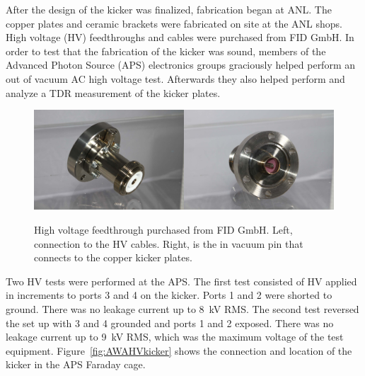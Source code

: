 

After the design of the kicker was finalized, fabrication began at ANL.
The copper plates and ceramic brackets were fabricated on site at the ANL shops.
High voltage (HV) feedthroughs and cables were purchased from FID GmbH. 
In order to test that the fabrication of the kicker was sound, members of the 
Advanced Photon Source (APS) electronics groups graciously helped perform an 
out of vacuum AC high voltage test. Afterwards they also helped perform and 
analyze a TDR measurement of the kicker plates.
\begin{figure}[h]
	\begin{center}
		\includegraphics[width=0.5\textwidth]{./images/FID_feedthrough1}\includegraphics[width=0.5\textwidth]{./images/FID_feedthrough2}
		\caption{High voltage feedthrough purchased from FID GmbH. Left, connection to the HV cables.
		Right, is the in vacuum pin that connects to the copper kicker plates.}
		\label{fig:feedthroughs}
	\end{center}
\end{figure}



Two HV tests were performed at the APS. 
The first test consisted of HV applied in increments to ports 3 and 4 on the kicker.
Ports 1 and 2 were shorted to ground. There was no leakage current up to \SI{8}{kV} RMS.
The second test reversed the set up with 3 and 4 grounded and ports 1 and 2 exposed. 
There was no leakage current up to \SI{9}{kV} RMS, which was the maximum voltage of the test equipment.
Figure~\ref{fig:AWAHVkicker} shows the connection and location of the kicker in the APS Faraday cage.

